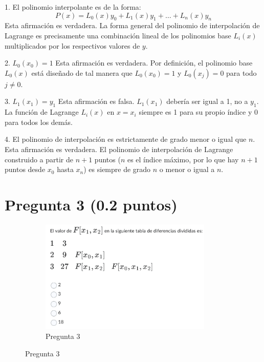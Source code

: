 1. El polinomio interpolante es de la forma:
\[ P(x) = L_0(x)y_0 + L_1(x)y_1 + \ldots + L_n(x)y_n \]
Esta afirmación es verdadera. La forma general del polinomio de interpolación de Lagrange es precisamente una combinación lineal de los polinomios base \(L_i(x)\) multiplicados por los respectivos valores de \(y\).

2. \( L_0(x_0) = 1 \)
Esta afirmación es verdadera. Por definición, el polinomio base \(L_0(x)\) está diseñado de tal manera que \(L_0(x_0) = 1\) y \(L_0(x_j) = 0\) para todo \(j \neq 0\).

3. \( L_1(x_1) = y_1 \)
Esta afirmación es falsa. \(L_1(x_1)\) debería ser igual a 1, no a \(y_1\). La función de Lagrange \(L_i(x)\) en \(x = x_i\) siempre es 1 para su propio índice y 0 para todos los demás.

4. El polinomio de interpolación es estrictamente de grado menor o igual que \(n\).
Esta afirmación es verdadera. El polinomio de interpolación de Lagrange construido a partir de \(n+1\) puntos (\(n\) es el índice máximo, por lo que hay \(n+1\) puntos desde \(x_0\) hasta \(x_n\)) es siempre de grado \(n\) o menor o igual a \(n\).

\section{Pregunta 3 (0.2 puntos)}
\begin{figure}[H]
    \centering
    \begin{subfigure}[b]{0.9\textwidth}
        \centering
        \includegraphics[width=0.9\textwidth]{Figures/0. General/3.png}
        \caption{Pregunta 3}
        \label{fig: pregunta 3}
    \end{subfigure}
\end{figure}

